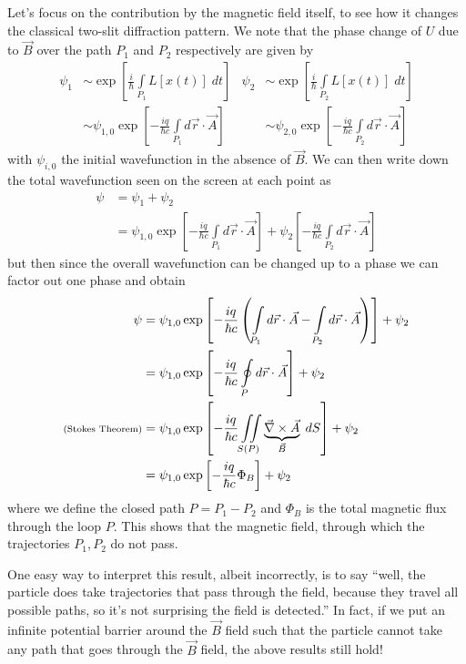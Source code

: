 \documentclass[12pt]{article}
\begin{document}
Let's focus on the contribution by the magnetic field itself, to see how it changes the classical two-slit diffraction pattern. We note that the phase change of $U$ due to $\vec{B}$ over the path $P_1$ and $P_2$ respectively are given by
\begin{align}
    \psi_1 &\sim \exp\left[ \frac{i}{\hbar}\int\limits_{P_1} L[x(t)]\;dt \right] & \psi_2 &\sim \exp\left[ \frac{i}{\hbar}\int\limits_{P_2} L[x(t)]\;dt \right]\\
    &\sim \psi_{1,0}\exp\left[ -\frac{iq}{\hbar c} \int\limits_{P_1}d\vec{r} \cdot \vec{A} \right] & &\sim \psi_{2,0}\exp\left[ -\frac{iq}{\hbar c} \int\limits_{P_2}d\vec{r} \cdot \vec{A} \right]
\end{align}
with $\psi_{i,0}$ the initial wavefunction in the absence of $\vec{B}$. We can then write down the total wavefunction seen on the screen at each point as
\begin{align}
    \psi &= \psi_1 + \psi_2\\
    &= \psi_{1,0}\exp\left[ -\frac{iq}{\hbar c} \int\limits_{P_1}d\vec{r} \cdot \vec{A} \right] + \psi_2 \left[ -\frac{iq}{\hbar c} \int\limits_{P_2}d\vec{r} \cdot \vec{A} \right]
\end{align}
but then since the overall wavefunction can be changed up to a phase we can factor out one phase and obtain
\begin{align}
    \psi &= \psi_{1,0}\exp\left[ -\frac{iq}{\hbar c} \left(\int\limits_{P_1}d\vec{r} \cdot \vec{A}  - \int\limits_{P_2}d\vec{r} \cdot \vec{A}\right) \right] + \psi_2\\
    &= \psi_{1,0}\exp\left[ -\frac{iq}{\hbar c} \oint\limits_{P}d\vec{r} \cdot \vec{A} \right] + \psi_2\\
    \text{{\scriptsize (Stokes Theorem)}}&= \psi_{1,0}\exp\left[ -\frac{iq}{\hbar c} \iint\limits_{S(P)}\underbrace{\vec{\nabla} \times \vec{A}}_{\vec{B}} \;dS \right] + \psi_2\\
    &= \psi_{1,0}\exp\left[ -\frac{iq}{\hbar c} \Phi_B \right] + \psi_2\label{ABfin}
\end{align}
where we define the closed path $P = P_1 - P_2$ and $\Phi_B$ is the total magnetic flux through the loop $P$. This shows that the magnetic field, through which the trajectories $P_1, P_2$ do not pass.

One easy way to interpret this result, albeit incorrectly, is to say ``well, the particle does take trajectories that pass through the field, because they travel all possible paths, so it's not surprising the field is detected.'' In fact, if we put an infinite potential barrier around the $\vec{B}$ field such that the particle cannot take any path that goes through the $\vec{B}$ field, the above results still hold!
\end{document}
